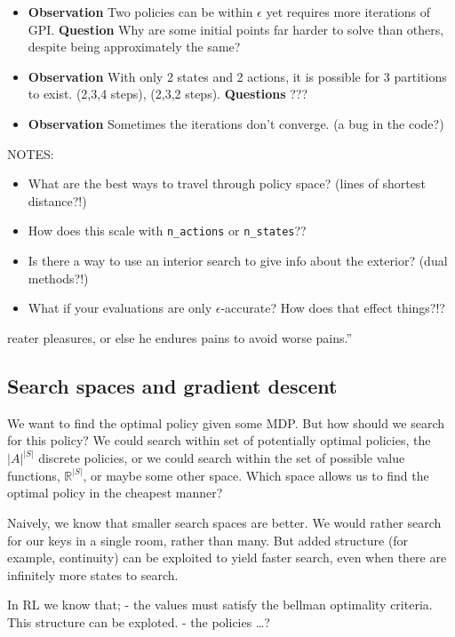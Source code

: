 \begin{itemize}
\item
  \textbf{Observation} Two policies can be within \(\epsilon\) yet
  requires more iterations of GPI. \textbf{Question} Why are some
  initial points far harder to solve than others, despite being
  approximately the same?
\item
  \textbf{Observation} With only 2 states and 2 actions, it is possible
  for 3 partitions to exist. (2,3,4 steps), (2,3,2 steps).
  \textbf{Questions} ???
\item
  \textbf{Observation} Sometimes the iterations don't converge. (a bug
  in the code?)
\end{itemize}

NOTES:

\begin{itemize}
\item
  What are the best ways to travel through policy space? (lines of
  shortest distance?!)
\item
  How does this scale with \texttt{n\_actions} or \texttt{n\_states}??
\item
  Is there a way to use an interior search to give info about the
  exterior? (dual methods?!)
\item
  What if your evaluations are only \(\epsilon\)-accurate? How does that
  effect things?!?
\end{itemize}reater pleasures, or else he endures pains to avoid worse pains.''

\subsection{Search spaces and gradient descent}

We want to find the optimal policy given some MDP. But how should we
search for this policy? We could search within set of potentially
optimal policies, the \(|A|^{|S|}\) discrete policies, or we could
search within the set of possible value functions, \(\mathbb R^{|S|}\),
or maybe some other space. Which space allows us to find the optimal
policy in the cheapest manner?

Naively, we know that smaller search spaces are better. We would rather
search for our keys in a single room, rather than many. But added
structure (for example, continuity) can be exploited to yield faster
search, even when there are infinitely more states to search.

In RL we know that; - the values must satisfy the bellman optimality
criteria. This structure can be exploted. - the policies \ldots{}?

